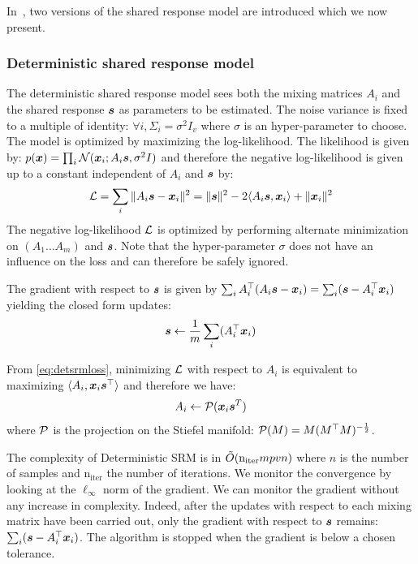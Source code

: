 In~\cite{chen2015reduced, anderson2016enabling}, two versions of the shared response model are
introduced which we now present.
\subsubsection{Deterministic shared response model}
\label{sec:deterministicsrm}
The deterministic shared response model sees both the mixing matrices $A_i$ and
the shared response $\boldsymbol{s}$ as parameters to be
estimated. The noise variance is fixed to a multiple of identity: $\forall i,
\Sigma_i=\sigma^2 I_v$ where $\sigma$ is an hyper-parameter to choose.
The model is optimized by maximizing the log-likelihood.
The likelihood is given by: $p(\boldsymbol{x}) = \prod_i \mathcal{N}(\boldsymbol{x}_i; A_i \boldsymbol{s}, \sigma^2 I)$ and
therefore the negative log-likelihood is given up to a constant independent of
$A_i$ and $\boldsymbol{s}$ by:
\begin{align}
  \mathcal{L} = \sum_i \|A_i \boldsymbol{s} - \boldsymbol{x}_i \|^2 = \| \boldsymbol{s} \|^2 -2 \langle A_i \boldsymbol{s}, \boldsymbol{x}_i \rangle + \| \boldsymbol{x}_i \|^2
  \label{eq:detsrmloss}
\end{align}
The negative log-likelihood $\mathcal{L}$ is optimized by performing alternate minimization on $(A_1 \dots A_m)$
and $\boldsymbol{s}$. Note that the hyper-parameter $\sigma$ does not have an influence on
the loss and can therefore be safely ignored.

The gradient with respect to $\boldsymbol{s}$ is given by $ \sum_i A_i^{\top}(A_i \boldsymbol{s} -
\boldsymbol{x}_i) = \sum_i (\boldsymbol{s} -
A_i^{\top} \boldsymbol{x}_i)$
yielding the closed form updates:
\begin{equation}
  \boldsymbol{s} \leftarrow  \frac1m \sum_i (A_i^{\top} \boldsymbol{x}_i)
  \label{eq:srm:supdate}
\end{equation}

From \eqref{eq:detsrmloss}, minimizing $\mathcal{L}$ with respect to $A_i$ is
equivalent to maximizing $\langle A_i, \boldsymbol{x}_i \boldsymbol{s}^{\top} \rangle$ and therefore we
have:
\begin{equation}
  A_i \leftarrow  \mathcal{P}(\boldsymbol{x}_i \boldsymbol{s}^T)
  \label{eq:detsrm:Aiupdate}
\end{equation}
where $\mathcal{P}$ is the projection on the Stiefel manifold: $\mathcal{P}(M) = M
(M^{\top}M)^{-\frac12}$.

The complexity of Deterministic SRM is in $\tilde{O}(\mathrm{n_{iter}} mpvn)$ where
$n$ is the number of samples and $\mathrm{n_{iter}}$ the number of iterations.
We monitor the convergence by looking at the $\ell_{\infty}$ norm of the
gradient. We can monitor the gradient without any increase in complexity.
Indeed, after the updates with respect to each mixing matrix have been
carried out, only the gradient with respect to $\boldsymbol{s}$ remains: $\sum_i
(\boldsymbol{s} - A_i^{\top}\boldsymbol{x}_i)$. The algorithm is stopped when the
gradient is below a chosen tolerance.

